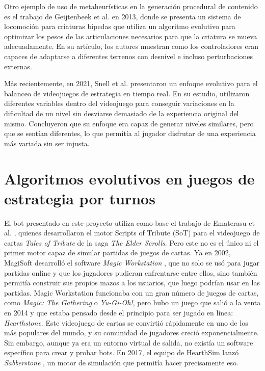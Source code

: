 Otro ejemplo de uso de metaheurísticas en la generación procedural de contenido es el trabajo de Geijtenbeek et al. \cite{geijtenbeek_flexible_2013} en 2013, donde se presenta un sistema de locomoción para criaturas bípedas que utiliza un algoritmo evolutivo para optimizar los pesos de las articulaciones necesarios para que la criatura se mueva adecuadamente. En su artículo, los autores muestran como los controladores eran capaces de adaptarse a diferentes terrenos con desnivel e incluso perturbaciones externas.

Más recientemente, en 2021, Snell et al. \cite{snell_evolutionary_2021} presentaron un enfoque evolutivo para el balanceo de videojuegos de estrategia en tiempo real. En su estudio, utilizaron diferentes variables dentro del videojuego para conseguir variaciones en la dificultad de un nivel sin desviarse demasiado de la experiencia original del mismo. Concluyeron que su enfoque era capaz de generar niveles similares, pero que se sentían diferentes, lo que permitía al jugador disfrutar de una experiencia más variada sin ser injusta.

\section{Algoritmos evolutivos en juegos de estrategia por turnos} \label{sec:trabajos_relacionados}

El bot presentado en este proyecto utiliza como base el trabajo de Ematerasu et al. \cite{ematerasu_scriptsoftribute_2022}, quienes desarrollaron el motor Scripts of Tribute (SoT) para el videojuego de cartas \textit{Tales of Tribute} de la saga \textit{The Elder Scrolls}. Pero este no es el único ni el primer motor capaz de simular partidas de juegos de cartas. Ya en 2002, MagiSoft desarrolló el software \textit{Magic Workstation} \cite{magi-soft_development_magic_2002}, que no solo se usó para jugar partidas online y que los jugadores pudieran enfrentarse entre ellos, sino también permitía construir sus propios mazos a los usuarios, que luego podrían usar en las partidas. Magic Workstation funcionaba con un gran número de juegos de cartas, como \textit{Magic: The Gathering} o \textit{Yu-Gi-Oh!}, pero hubo un juego que salió a la venta en 2014 y que estaba pensado desde el principio para ser jugado en línea: \textit{Hearthstone}. Este videojuego de cartas se convirtió rápidamente en uno de los más populares del mundo, y su comunidad de jugadores creció exponencialmente. Sin embargo, aunque ya era un entorno virtual de salida, no existía un software específico para crear y probar bots. En 2017, el equipo de HearthSim lanzó \textit{Sabberstone} \cite{hearthsim_hearthsimsabberstone_2017}, un motor de simulación que permitía hacer precisamente eso.

